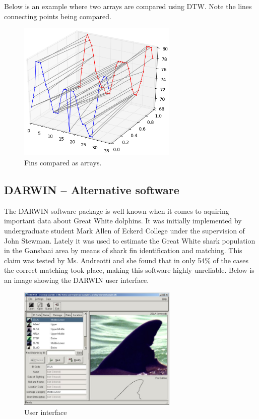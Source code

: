 \documentclass[a4paper,10pt]{article}
\begin{document}
Below is an example where two arrays are compared using DTW. Note the lines connecting points being compared.
\begin{figure}[H]
 \centering
 \includegraphics[width=3in]{dtw.jpg}
 \caption{Fins compared as arrays.}
 \label{dtw}
\end{figure}

\subsection{DARWIN -- Alternative software}
The DARWIN\cite{Darwin} software package is well known when it comes to aquiring important data about Great White dolphins.  It was initially implemented by undergraduate 
student Mark Allen of Eckerd College under the supervision of John Stewman.  Lately it was used to estimate the Great White
shark population in the Gansbaai area by means of shark fin identification and matching.  This claim was tested by Ms. Andreotti and she found that in only
54\% of the cases the correct matching took place, making this software highly
unreliable.  Below is an image showing the DARWIN user interface. 

\begin{figure}[H]
 \centering
 \includegraphics[width=3in]{Darwin.jpg}
 \caption{User interface}
\end{figure}
\end{document}
